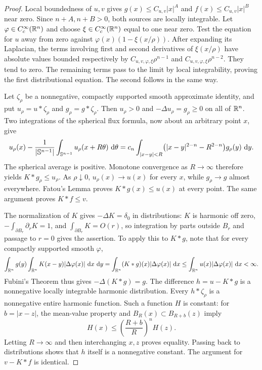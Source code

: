 \begin{proof}
Local boundedness of $u,v$ gives
$g(x)\le C_{u,v}|x|^A$ and $f(x)\le C_{u,v}|x|^B$ near zero.
Since $n+A,n+B>0$, both sources are locally integrable.  Let
$\varphi\in C_c^\infty(\mathbb R^n)$ and choose
$\xi\in C_c^\infty(\mathbb R^n)$ equal to one near zero.  Test the equation for
$u$ away from zero against
$\varphi(x)(1-\xi(x/\rho))$.  After expanding its Laplacian, the terms
involving first and second derivatives of $\xi(x/\rho)$ have absolute
values bounded respectively by $C_{u,v,\varphi,\xi}\rho^{n-1}$ and
$C_{u,v,\varphi,\xi}\rho^{n-2}$.  They tend to zero.  The remaining
terms pass to the limit by local integrability, proving the first
distributional equation.  The second follows in the same way.

Let $\zeta_\rho$ be a nonnegative, compactly supported smooth approximate
identity, and put $u_\rho=u*\zeta_\rho$ and $g_\rho=g*\zeta_\rho$.
Then $u_\rho>0$ and $-\Delta u_\rho=g_\rho\ge0$ on all of $\mathbb R^n$.
Two integrations of the spherical flux formula, now about an arbitrary
point $x$, give
\[
 u_\rho(x)-\frac1{|\mathbb S^{n-1}|}\int_{\mathbb S^{n-1}}u_\rho(x+R\theta)\,\,\mathrm d\theta
 =c_n\int_{|x-y|<R}
       \bigl(|x-y|^{2-n}-R^{2-n}\bigr)g_\rho(y)\,\,\mathrm d y.
\]
The spherical average is positive.  Monotone convergence as $R\to\infty$
therefore yields $K*g_\rho\le u_\rho$.  As $\rho\downarrow0$,
$u_\rho(x)\to u(x)$ for every $x$, while $g_\rho\to g$ almost everywhere.
Fatou's Lemma proves $K*g(x)\le u(x)$ at every point.  The same argument
proves $K*f\le v$.

The normalization of $K$ gives $-\Delta K=\delta_0$ in distributions:
$K$ is harmonic off zero,
$-\int_{\partial B_r}\partial_rK=1$, and
$\int_{\partial B_r}K=O(r)$, so integration by parts outside $B_r$
and passage to $r=0$ gives the assertion.  To apply this to $K*g$, note
that for every compactly supported smooth $\varphi$,
\[
 \int_{\mathbb R^n}g(y)\int_{\mathbb R^n}K(x-y)|\Delta\varphi(x)|\,\,\mathrm d x\,\,\mathrm d y
 =\int_{\mathbb R^n}(K*g)(x)|\Delta\varphi(x)|\,\,\mathrm d x
 \le\int_{\mathbb R^n}u(x)|\Delta\varphi(x)|\,\,\mathrm d x<\infty.
\]
Fubini's Theorem thus gives $-\Delta(K*g)=g$.  The difference
$h=u-K*g$ is a nonnegative locally integrable harmonic distribution.
Every $h*\zeta_\rho$ is a nonnegative entire harmonic function.
Such a function $H$ is constant: for $b=|x-z|$, the mean-value property
and $B_R(x)\subset B_{R+b}(z)$ imply
\[
 H(x)\le\left(\frac{R+b}{R}\right)^n H(z).
\]
Letting $R\to\infty$ and then interchanging $x,z$ proves equality.
Passing back to distributions shows that $h$ itself is a nonnegative
constant.  The argument for $v-K*f$ is identical.


\end{proof}
